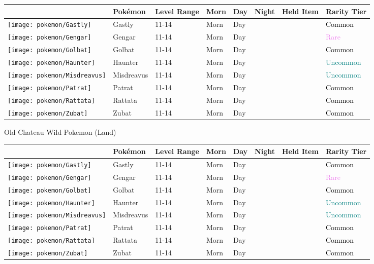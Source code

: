 \begin{longtable}{||l l l l l l l l||}%
\hline%
&Pokémon&Level Range&Morn&Day&Night&Held Item&Rarity Tier\\%
\hline%
\endhead%
\hline%
\texttt{[image: pokemon/Gastly]}&Gastly&11{-}14&Morn&Day&&&\textcolor{black}{%
Common%
}\\%
\hline%
\texttt{[image: pokemon/Gengar]}&Gengar&11{-}14&Morn&Day&&&\textcolor{violet}{%
Rare%
}\\%
\hline%
\texttt{[image: pokemon/Golbat]}&Golbat&11{-}14&Morn&Day&&&\textcolor{black}{%
Common%
}\\%
\hline%
\texttt{[image: pokemon/Haunter]}&Haunter&11{-}14&Morn&Day&&&\textcolor{teal}{%
Uncommon%
}\\%
\hline%
\texttt{[image: pokemon/Misdreavus]}&Misdreavus&11{-}14&Morn&Day&&&\textcolor{teal}{%
Uncommon%
}\\%
\hline%
\texttt{[image: pokemon/Patrat]}&Patrat&11{-}14&Morn&Day&&&\textcolor{black}{%
Common%
}\\%
\hline%
\texttt{[image: pokemon/Rattata]}&Rattata&11{-}14&Morn&Day&&&\textcolor{black}{%
Common%
}\\%
\hline%
\texttt{[image: pokemon/Zubat]}&Zubat&11{-}14&Morn&Day&&&\textcolor{black}{%
Common%
}\\%
\hline%
\end{longtable}%
\caption{Old Chateau Wild Pokemon (Land)}%
\begin{longtable}{||l l l l l l l l||}%
\hline%
&Pokémon&Level Range&Morn&Day&Night&Held Item&Rarity Tier\\%
\hline%
\endhead%
\hline%
\texttt{[image: pokemon/Gastly]}&Gastly&11{-}14&Morn&Day&&&\textcolor{black}{%
Common%
}\\%
\hline%
\texttt{[image: pokemon/Gengar]}&Gengar&11{-}14&Morn&Day&&&\textcolor{violet}{%
Rare%
}\\%
\hline%
\texttt{[image: pokemon/Golbat]}&Golbat&11{-}14&Morn&Day&&&\textcolor{black}{%
Common%
}\\%
\hline%
\texttt{[image: pokemon/Haunter]}&Haunter&11{-}14&Morn&Day&&&\textcolor{teal}{%
Uncommon%
}\\%
\hline%
\texttt{[image: pokemon/Misdreavus]}&Misdreavus&11{-}14&Morn&Day&&&\textcolor{teal}{%
Uncommon%
}\\%
\hline%
\texttt{[image: pokemon/Patrat]}&Patrat&11{-}14&Morn&Day&&&\textcolor{black}{%
Common%
}\\%
\hline%
\texttt{[image: pokemon/Rattata]}&Rattata&11{-}14&Morn&Day&&&\textcolor{black}{%
Common%
}\\%
\hline%
\texttt{[image: pokemon/Zubat]}&Zubat&11{-}14&Morn&Day&&&\textcolor{black}{%
Common%
}\\%
\hline%
\end{longtable}%
